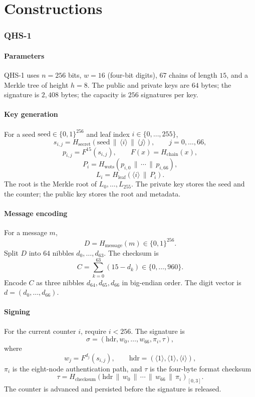 \documentclass[11pt,a4paper]{article}
\theoremstyle{remark}
\newcommand{\concat}{\,\|\,}
\newcommand{\bits}{\{0,1\}}
\begin{document}
\part{Constructions}

\section{QHS-1}

\subsection{Parameters}

QHS-1 uses \(n=256\) bits, \(w=16\) (four-bit digits), \(67\) chains of length
\(15\), and a Merkle tree of height \(h=8\). The public and private keys are
\(64\) bytes; the signature is \(2{,}408\) bytes; the capacity is \(256\)
signatures per key.

\subsection{Key generation}

For a seed \(\mathrm{seed}\in\bits^{256}\) and leaf index \(i\in\{0,\dots,255\}\),
\[
s_{i,j}=H_{\text{secret}}(\mathrm{seed}\concat\langle i\rangle\concat\langle j\rangle),
\qquad j=0,\dots,66,
\]
\[
p_{i,j}=F^{15}(s_{i,j}),\qquad F(x)=H_{\text{chain}}(x),
\]
\[
P_i=H_{\text{wots}}(p_{i,0}\concat\cdots\concat p_{i,66}),
\]
\[
L_i=H_{\text{leaf}}(\langle i\rangle\concat P_i).
\]
The root is the Merkle root of \(L_0,\dots,L_{255}\). The private key stores the
seed and the counter; the public key stores the root and metadata.

\subsection{Message encoding}

For a message \(m\),
\[
D=H_{\text{message}}(m)\in\bits^{256}.
\]
Split \(D\) into \(64\) nibbles \(d_0,\dots,d_{63}\). The checksum is
\[
C=\sum_{k=0}^{63}(15-d_k)\in\{0,\dots,960\}.
\]
Encode \(C\) as three nibbles \(d_{64},d_{65},d_{66}\) in big-endian order. The
digit vector is \(d=(d_0,\dots,d_{66})\).

\subsection{Signing}

For the current counter \(i\), require \(i<256\). The signature is
\[
\sigma=(\mathrm{hdr},w_0,\dots,w_{66},\pi_i,\tau),
\]
where
\[
w_j=F^{d_j}(s_{i,j}),\qquad
\mathrm{hdr}=(\langle 1\rangle,\langle 1\rangle,\langle i\rangle),
\]
\(\pi_i\) is the eight-node authentication path, and \(\tau\) is the
four-byte format checksum
\[
\tau=H_{\text{checksum}}(\mathrm{hdr}\concat w_0\concat\cdots\concat w_{66}\concat\pi_i)_{[0,3]}.
\]
The counter is advanced and persisted before the signature is released.
\end{document}
